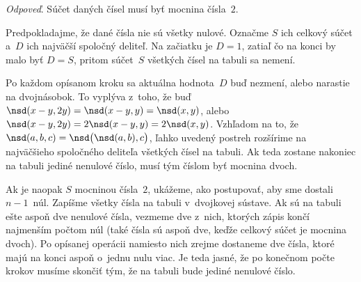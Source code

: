 {%
{\it Odpoveď}. Súčet daných čísel musí byť mocnina čísla~$2$.

\smallskip
Predpokladajme, že dané čísla nie sú všetky nulové.
Označme $S$ ich celkový súčet a~$D$ ich najväčší spoločný deliteľ.
Na začiatku je $D=1$, zatiaľ čo na konci by malo byť $D=S$, pritom súčet~$S$
všetkých čísel na tabuli sa nemení.

Po každom opísanom kroku sa aktuálna hodnota~$D$ buď nezmení, alebo narastie na
dvojnásobok. To vyplýva z~toho, že buď $\nsd(x-y,2y)=\nsd(x-y,y)=\nsd(x,y)$,
alebo $\nsd(x-y,2y)=2\nsd(x-y,y)=2\nsd(x,y)$. Vzhľadom na to, že
$\nsd(a,b,c)=\nsd\bigl(\nsd(a,b),c\bigr)$, ľahko uvedený postreh rozšírime na
najväčšieho spoločného deliteľa všetkých čísel na tabuli.
Ak teda zostane nakoniec na tabuli jediné nenulové číslo, musí tým číslom
byť mocnina dvoch.

Ak je naopak $S$ mocninou čísla~$2$, ukážeme, ako postupovať, aby sme
dostali ${n-1}$~núl. Zapíšme všetky čísla na tabuli v~dvojkovej sústave.
Ak sú na tabuli ešte aspoň dve nenulové čísla, vezmeme dve z~nich,
ktorých zápis končí najmenším počtom núl (také čísla sú aspoň dve, keďže
celkový súčet je mocnina dvoch). Po opísanej operácii namiesto nich zrejme
dostaneme dve čísla, ktoré majú na konci aspoň o~jednu nulu viac. Je teda jasné, že
po konečnom počte krokov musíme skončiť tým, že na tabuli bude jediné
nenulové číslo.}

